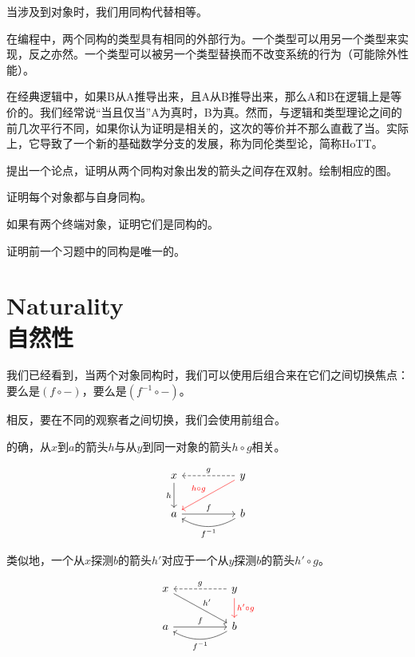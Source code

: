 \documentclass[DaoFP]{subfiles}
\begin{document}
 当涉及到对象时，我们用同构代替相等。

 在编程中，两个同构的类型具有相同的外部行为。一个类型可以用另一个类型来实现，反之亦然。一个类型可以被另一个类型替换而不改变系统的行为（可能除外性能）。

 在经典逻辑中，如果B从A推导出来，且A从B推导出来，那么A和B在逻辑上是等价的。我们经常说“当且仅当”A为真时，B为真。然而，与逻辑和类型理论之间的前几次平行不同，如果你认为证明是相关的，这次的等价并不那么直截了当。实际上，它导致了一个新的基础数学分支的发展，称为同伦类型论，简称HoTT。

 \begin{exercise}
  提出一个论点，证明从两个同构对象出发的箭头之间存在双射。绘制相应的图。
 \end{exercise}

 \begin{exercise}
  证明每个对象都与自身同构。
 \end{exercise}

 \begin{exercise}
  如果有两个终端对象，证明它们是同构的。
 \end{exercise}

 \begin{exercise}
  证明前一个习题中的同构是唯一的。
 \end{exercise}

 \section{Naturality\\自然性}

 我们已经看到，当两个对象同构时，我们可以使用后组合来在它们之间切换焦点：要么是$(f \circ -)$，要么是$(f^{-1} \circ -)$。

 相反，要在不同的观察者之间切换，我们会使用前组合。

 的确，从$x$到$a$的箭头$h$与从$y$到同一对象的箭头$h\circ g$相关。

 \[
  \begin{tikzcd}
   x
   \arrow[d, "h"']
   && y
   \arrow[ll, dashed, "g"']
   \arrow[dll, red, "h \circ g"']
   \\
   a
   \arrow[rr, "f"]
   && b
   \arrow[ll, bend left,  "f^{-1}"]
  \end{tikzcd}
 \]

 类似地，一个从$x$探测$b$的箭头$h'$对应于一个从$y$探测$b$的箭头$h' \circ g$。

 \[
  \begin{tikzcd}
   x
   \arrow[drr, "h'"]
   && y
   \arrow[ll, dashed, "g"']
   \arrow[d, red, "h' \circ g"]
   \\
   a
   \arrow[rr, "f"]
   && b
   \arrow[ll, bend left,  "f^{-1}"]
  \end{tikzcd}
 \]
\end{document}
